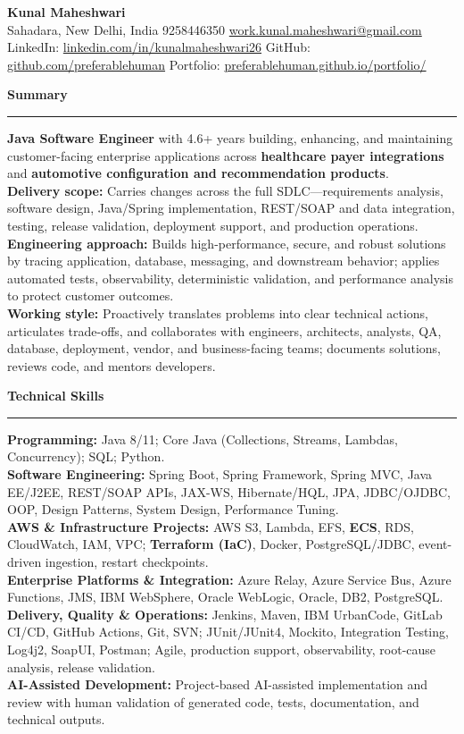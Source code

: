 \documentclass[11pt,letterpaper]{article}
\newcommand{\ressection}[1]{\Needspace{6\baselineskip}\vspace{8pt}\par\textbf{#1}\par\vspace{2pt}\hrule\vspace{5pt}}
\begin{document}
\pagestyle{empty}\raggedright\fontsize{11}{12.5}\selectfont

{\Large \textbf{Kunal Maheshwari}}\\
Sahadara, New Delhi, India \textbar{} 9258446350 \textbar{} \href{mailto:work.kunal.maheshwari@gmail.com}{work.kunal.maheshwari@gmail.com}\\
LinkedIn: \href{https://www.linkedin.com/in/kunalmaheshwari26}{linkedin.com/in/kunalmaheshwari26} \textbar{} GitHub: \href{https://github.com/preferablehuman}{github.com/preferablehuman} \textbar{} Portfolio: \href{https://preferablehuman.github.io/portfolio/}{preferablehuman.github.io/portfolio/}

\ressection{Summary}
\textbf{Java Software Engineer} with 4.6+ years building, enhancing, and maintaining customer-facing enterprise applications across \textbf{healthcare payer integrations} and \textbf{automotive configuration and recommendation products}.\\[2pt]
\textbf{Delivery scope:} Carries changes across the full SDLC---requirements analysis, software design, Java/Spring implementation, REST/SOAP and data integration, testing, release validation, deployment support, and production operations.\\[2pt]
\textbf{Engineering approach:} Builds high-performance, secure, and robust solutions by tracing application, database, messaging, and downstream behavior; applies automated tests, observability, deterministic validation, and performance analysis to protect customer outcomes.\\[2pt]
\textbf{Working style:} Proactively translates problems into clear technical actions, articulates trade-offs, and collaborates with engineers, architects, analysts, QA, database, deployment, vendor, and business-facing teams; documents solutions, reviews code, and mentors developers.

\ressection{Technical Skills}
\textbf{Programming:} Java 8/11; Core Java (Collections, Streams, Lambdas, Concurrency); SQL; Python.\\
\textbf{Software Engineering:} Spring Boot, Spring Framework, Spring MVC, Java EE/J2EE, REST/SOAP APIs, JAX-WS, Hibernate/HQL, JPA, JDBC/OJDBC, OOP, Design Patterns, System Design, Performance Tuning.\\
\textbf{AWS \& Infrastructure Projects:} AWS S3, Lambda, EFS, \textbf{ECS}, RDS, CloudWatch, IAM, VPC; \textbf{Terraform (IaC)}, Docker, PostgreSQL/JDBC, event-driven ingestion, restart checkpoints.\\
\textbf{Enterprise Platforms \& Integration:} Azure Relay, Azure Service Bus, Azure Functions, JMS, IBM WebSphere, Oracle WebLogic, Oracle, DB2, PostgreSQL.\\
\textbf{Delivery, Quality \& Operations:} Jenkins, Maven, IBM UrbanCode, GitLab CI/CD, GitHub Actions, Git, SVN; JUnit/JUnit4, Mockito, Integration Testing, Log4j2, SoapUI, Postman; Agile, production support, observability, root-cause analysis, release validation.\\
\textbf{AI-Assisted Development:} Project-based AI-assisted implementation and review with human validation of generated code, tests, documentation, and technical outputs.
\end{document}

